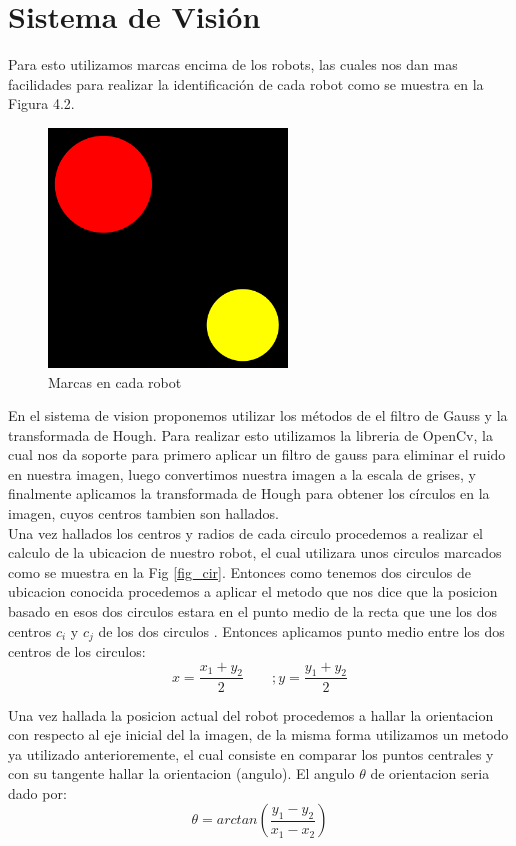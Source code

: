 \section{Sistema de Visi\'on}
Para esto utilizamos marcas encima de los robots, las cuales nos dan mas facilidades para realizar la identificaci\'on de cada robot como se muestra en la Figura 4.2.
	\begin{figure}
	\centering
	\includegraphics[width=2.5in]{imagen1.pdf}
	
	\caption{Marcas en cada robot}
	\label{fig_mar}
\end{figure}
En el sistema de vision proponemos utilizar los m\'etodos de el filtro de Gauss y la transformada de Hough. Para realizar esto utilizamos la libreria de OpenCv, la cual nos da soporte para primero aplicar un filtro de gauss para eliminar el ruido en nuestra imagen, luego convertimos nuestra imagen a la escala de grises, y finalmente aplicamos la transformada de Hough para obtener los c\'irculos en la imagen, cuyos centros tambien son hallados.\\
Una vez hallados los centros y radios de cada circulo procedemos a realizar el calculo de la ubicacion de nuestro robot, el cual utilizara unos circulos marcados como se muestra en la Fig  \ref{fig_cir}. Entonces como tenemos dos circulos de ubicacion conocida procedemos a aplicar el metodo  que nos dice que la posicion basado en esos dos circulos estara en el punto medio de la recta que une los dos centros  $c_i$ y $c_j$ de los dos circulos \cite{kelson_glo}. Entonces aplicamos punto medio entre los dos centros de los circulos:
\begin{equation}
x=\frac{x_1+y_2}{2} \qquad; y=\frac{y_1+y_2}{{2}}
\end{equation}

Una vez hallada la posicion actual del robot procedemos a hallar la orientacion con respecto al eje inicial del la imagen, de la misma forma utilizamos un metodo ya utilizado anterioremente,  el cual consiste en comparar los puntos centrales y con su tangente hallar la orientacion (angulo)\cite{kelson_glo}. El angulo $\theta$ de orientacion seria dado por:
\begin{equation}
\theta=arctan(\frac{y_1-y_2}{x_1-x_2} )
\end{equation}

